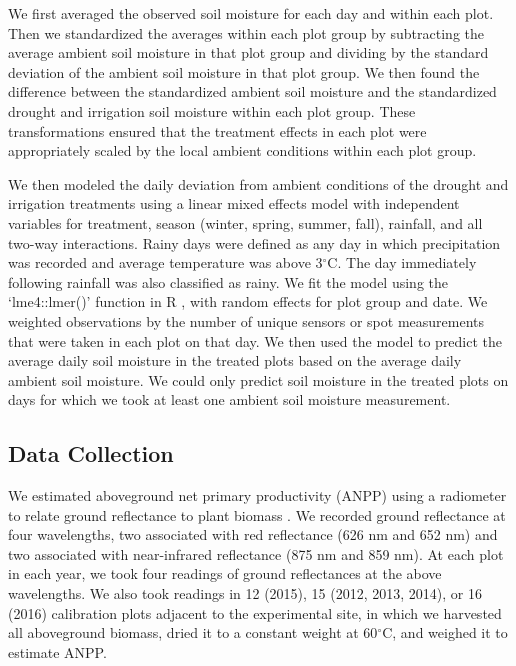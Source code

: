 \documentclass[fleqn,10pt,lineno]{wlpeerj} %
\begin{document}
We first averaged the observed soil moisture for each day and within
each plot. Then we standardized the averages within each plot group by
subtracting the average ambient soil moisture in that plot group and
dividing by the standard deviation of the ambient soil moisture in that
plot group. We then found the difference between the standardized
ambient soil moisture and the standardized drought and irrigation soil
moisture within each plot group. These transformations ensured that the
treatment effects in each plot were appropriately scaled by the local
ambient conditions within each plot group.

We then modeled the daily deviation from ambient conditions of the
drought and irrigation treatments using a linear mixed effects model
with independent variables for treatment, season (winter, spring,
summer, fall), rainfall, and all two-way interactions. Rainy days were
defined as any day in which precipitation was recorded and average
temperature was above 3\(^{\circ}\)C. The day immediately following
rainfall was also classified as rainy. We fit the model using the
`lme4::lmer()' function \citep{Bates2015} in R \citep{R2016}, with
random effects for plot group and date. We weighted observations by the
number of unique sensors or spot measurements that were taken in each
plot on that day. We then used the model to predict the average daily
soil moisture in the treated plots based on the average daily ambient
soil moisture. We could only predict soil moisture in the treated plots
on days for which we took at least one ambient soil moisture
measurement.

\subsection{Data Collection}\label{data-collection}

We estimated aboveground net primary productivity (ANPP) using a
radiometer to relate ground reflectance to plant biomass \citep[see][
for a review]{Byrne2011}. We recorded ground reflectance at four
wavelengths, two associated with red reflectance (626 nm and 652 nm) and
two associated with near-infrared reflectance (875 nm and 859 nm). At
each plot in each year, we took four readings of ground reflectances at
the above wavelengths. We also took readings in 12 (2015), 15 (2012,
2013, 2014), or 16 (2016) calibration plots adjacent to the experimental
site, in which we harvested all aboveground biomass, dried it to a
constant weight at 60\(^{\circ}\)C, and weighed it to estimate ANPP.
\end{document}
